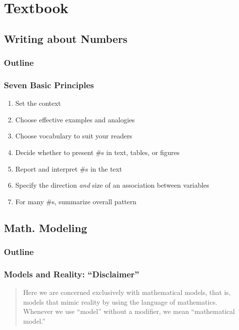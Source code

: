 \section{Textbook}

\subsection{Writing about Numbers}

\begin{frame}
    \frametitle{Outline}
\end{frame}
\begin{frame}
    \frametitle{Seven Basic Principles}
     \begin{enumerate}
         \item Set the context 
         \item Choose effective examples and analogies
         \item Choose vocabulary to suit your readers
         \item Decide whether to present \#s in text, tables, or figures
         \item Report and interpret \#s in the text
         \item Specify the direction \emph{and} size of an association between variables
         \item For many \#s, summarize overall pattern 
     \end{enumerate}
\end{frame}

\subsection{Math. Modeling}

\begin{frame}
    \frametitle{Outline}
\end{frame}

\begin{frame}
    \frametitle{Models and Reality: ``Disclaimer''}
    \begin{verse}
        Here we are concerned exclusively with mathematical models, that is,
        models that mimic reality by using the language of mathematics.
        Whenever we use ``model'' without a modifier, we mean ``mathematical
        model.''
    \end{verse}
\end{frame}


